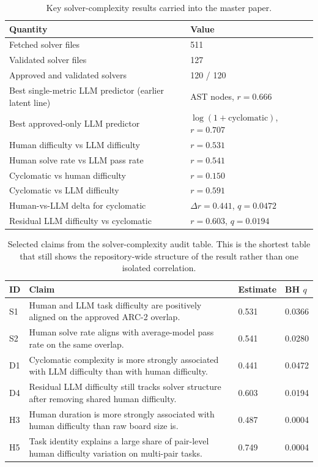 \begin{table}[H]
\centering
\small
\caption{Key solver-complexity results carried into the master paper.}
\begin{tabular}{p{3.25in}p{1.6in}}
\toprule
\textbf{Quantity} & \textbf{Value} \\
\midrule
Fetched solver files & 511 \\
Validated solver files & 127 \\
Approved and validated solvers & 120 / 120 \\
Best single-metric LLM predictor (earlier latent line) & AST nodes, $r = 0.666$ \\
Best approved-only LLM predictor & $\log(1 + \mathrm{cyclomatic})$, $r = 0.707$ \\
Human difficulty vs LLM difficulty & $r = 0.531$ \\
Human solve rate vs LLM pass rate & $r = 0.541$ \\
Cyclomatic vs human difficulty & $r = 0.150$ \\
Cyclomatic vs LLM difficulty & $r = 0.591$ \\
Human-vs-LLM delta for cyclomatic & $\Delta r = 0.441$, $q = 0.0472$ \\
Residual LLM difficulty vs cyclomatic & $r = 0.603$, $q = 0.0194$ \\
\bottomrule
\end{tabular}
\end{table}

\begin{table}[H]
\centering
\scriptsize
\caption{Selected claims from the solver-complexity audit table. This is the shortest table that still shows the repository-wide structure of the result rather than one isolated correlation.}
\begin{tabular}{p{0.5in}p{3.1in}p{0.7in}p{0.7in}}
\toprule
\textbf{ID} & \textbf{Claim} & \textbf{Estimate} & \textbf{BH $q$} \\
\midrule
S1 & Human and LLM task difficulty are positively aligned on the approved ARC-2 overlap. & 0.531 & 0.0366 \\
S2 & Human solve rate aligns with average-model pass rate on the same overlap. & 0.541 & 0.0280 \\
D1 & Cyclomatic complexity is more strongly associated with LLM difficulty than with human difficulty. & 0.441 & 0.0472 \\
D4 & Residual LLM difficulty still tracks solver structure after removing shared human difficulty. & 0.603 & 0.0194 \\
H3 & Human duration is more strongly associated with human difficulty than raw board size is. & 0.487 & 0.0004 \\
H5 & Task identity explains a large share of pair-level human difficulty variation on multi-pair tasks. & 0.749 & 0.0004 \\
\bottomrule
\end{tabular}
\end{table}


